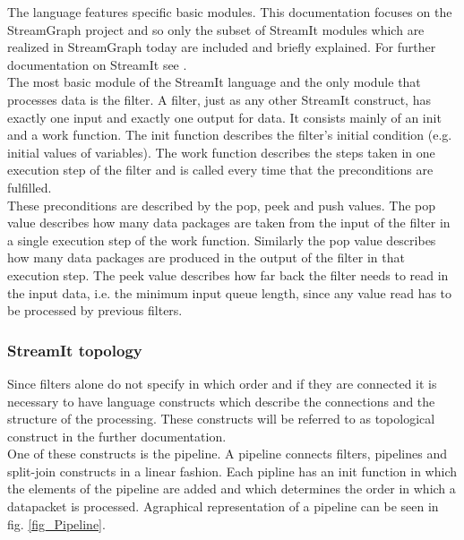 \documentclass[journal]{IEEEtran}
\begin{document}
The language features specific basic modules. This documentation focuses on the
StreamGraph project and so only the subset of StreamIt modules which are
realized in StreamGraph today are included and briefly explained. For further
documentation on StreamIt see \cite{streamIt}.\\

The most basic module of the StreamIt language and the only module that
processes data is the filter. A filter, just as any other StreamIt construct,
has exactly one input and exactly one output for data. It consists mainly of 
an init and a work function. The init function describes the filter's initial
condition (e.g. initial values of variables). The work function describes the
steps taken in one execution step of the filter and is called every time that
the preconditions are fulfilled.\\

These preconditions are described by the pop, peek and push values. The pop
value describes how many data packages are taken from the input of the filter in
a single execution step of the work function. Similarly the pop value describes
how many data packages are produced in the output of the filter in that
execution step. The peek value describes how far back the filter needs to read
in the input data, i.e. the minimum input queue length, since any value read has
to be processed by previous filters.


\subsubsection{StreamIt topology}
\label{StreamItTopology}
\noindent Since filters alone do not specify in which order and if they are
connected it is necessary to have language constructs which describe the
connections and the structure of the processing. These constructs will be
referred to as topological construct in the further documentation.\\

One of these constructs is the pipeline. A pipeline connects filters, pipelines
and split-join constructs in a linear fashion. Each pipline has an init function
in which the elements of the pipeline are added and which determines the order
in which a datapacket is processed. Agraphical representation of a pipeline can 
be seen in fig. \ref{fig_Pipeline}.\\
\\
\end{document}
